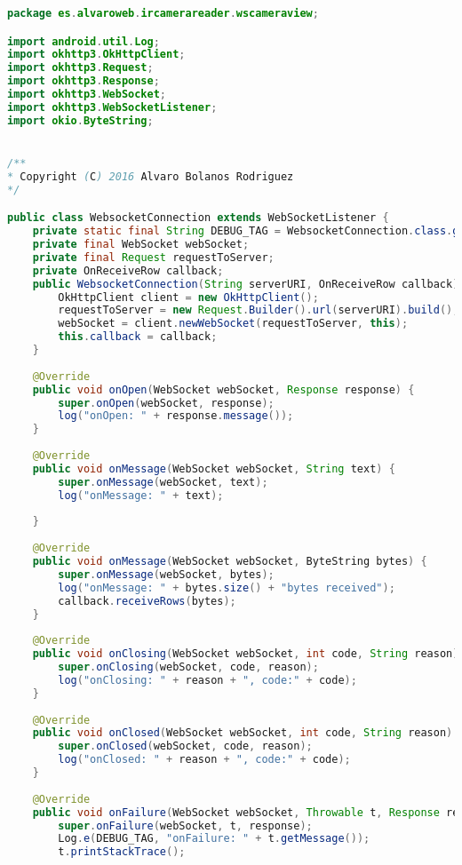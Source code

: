 \documentclass[hidelinks,11pt,a4paper,oneside,article]{memoir}
\begin{document}
\begin{lstlisting}[label={listing:websocketconnection},caption={WebsocketConnection class, makes a websocket connection},language=Java, style=styleprogrammingappendix]
package es.alvaroweb.ircamerareader.wscameraview;

import android.util.Log;
import okhttp3.OkHttpClient;
import okhttp3.Request;
import okhttp3.Response;
import okhttp3.WebSocket;
import okhttp3.WebSocketListener;
import okio.ByteString;


/**
* Copyright (C) 2016 Alvaro Bolanos Rodriguez
*/

public class WebsocketConnection extends WebSocketListener {
    private static final String DEBUG_TAG = WebsocketConnection.class.getSimpleName();
    private final WebSocket webSocket;
    private final Request requestToServer;
    private OnReceiveRow callback;
    public WebsocketConnection(String serverURI, OnReceiveRow callback) {
        OkHttpClient client = new OkHttpClient();
        requestToServer = new Request.Builder().url(serverURI).build();
        webSocket = client.newWebSocket(requestToServer, this);
        this.callback = callback;
    }
    
    @Override
    public void onOpen(WebSocket webSocket, Response response) {
        super.onOpen(webSocket, response);
        log("onOpen: " + response.message());
    }
    
    @Override
    public void onMessage(WebSocket webSocket, String text) {
        super.onMessage(webSocket, text);
        log("onMessage: " + text);
        
    }
    
    @Override
    public void onMessage(WebSocket webSocket, ByteString bytes) {
        super.onMessage(webSocket, bytes);
        log("onMessage: " + bytes.size() + "bytes received");
        callback.receiveRows(bytes);
    }
    
    @Override
    public void onClosing(WebSocket webSocket, int code, String reason) {
        super.onClosing(webSocket, code, reason);
        log("onClosing: " + reason + ", code:" + code);
    }
    
    @Override
    public void onClosed(WebSocket webSocket, int code, String reason) {
        super.onClosed(webSocket, code, reason);
        log("onClosed: " + reason + ", code:" + code);
    }
    
    @Override
    public void onFailure(WebSocket webSocket, Throwable t, Response response) {
        super.onFailure(webSocket, t, response);
        Log.e(DEBUG_TAG, "onFailure: " + t.getMessage());
        t.printStackTrace();
        

\end{lstlisting}
\end{document}
